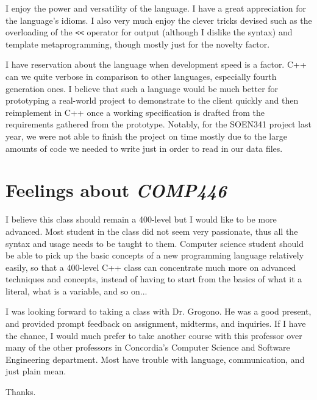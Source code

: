 \documentclass{article}
\begin{document}
I enjoy the power and versatility of the language.  I have a great appreciation
for the language's idioms.  I also very much enjoy the clever tricks devised
such as the overloading of the \verb|<<| operator for output (although I
dislike the syntax) and template metaprogramming, though mostly just for the
novelty factor.

I have reservation about the language when development speed is a factor. C++
can we quite verbose in comparison to other languages, especially fourth
generation ones.  I believe that such a language would be much better for
prototyping a real-world project to demonstrate to the client quickly and then
reimplement in C++ once a working specification is drafted from the
requirements gathered from the prototype. Notably, for the SOEN341 project last
year, we were not able to finish the project on time mostly due to the large
amounts of code we needed to write just in order to read in our data files.

\section{Feelings about \textit{COMP446}}
I believe this class should remain a 400-level but I would like to be more
advanced.  Most student in the class did not seem very passionate, thus all the
syntax and usage needs to be taught to them.  Computer science student should
be able to pick up the basic concepts of a new programming language relatively
easily, so that a 400-level C++ class can concentrate much more on advanced
techniques and concepts, instead of having to start from the basics of what it
a literal, what is a variable, and so on...

I was looking forward to taking a class with Dr. Grogono.  He was a good
present, and provided prompt feedback on assignment, midterms, and inquiries.
If I have the chance, I would much prefer to take another course with this
professor over many of the other professors in Concordia's Computer Science and
Software Engineering department.  Most have trouble with language,
communication, and just plain mean.

Thanks.
\end{document}
